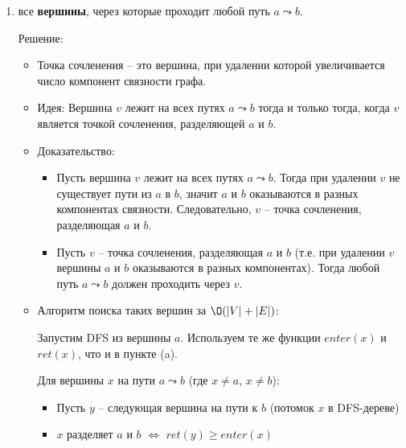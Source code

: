 \begin{enumerate}
\begin{enumerate}
\begin{itemize}
        Итого: $\O(|V| + |E|)$
        
        \item Сложность по памяти: $\O(|V|)$ -- массивы $enter$, $ret$, $parent$
      \end{itemize}

      \item все \textbf{вершины}, через которые проходит любой путь $a \leadsto b$.
      
      Решение:

      \begin{itemize}
        \item Точка сочленения -- это вершина, при удалении которой увеличивается число компонент связности графа.

        \item Идея: Вершина $v$ лежит на всех путях $a \leadsto b$ тогда и только тогда, когда $v$ является точкой сочленения, разделяющей $a$ и $b$.

        \item Доказательство:
        \begin{itemize}
          \item[$\Rightarrow$] Пусть вершина $v$ лежит на всех путях $a \leadsto b$. Тогда при удалении $v$ не существует пути из $a$ в $b$, значит $a$ и $b$ оказываются в разных компонентах связности. Следовательно, $v$ -- точка сочленения, разделяющая $a$ и $b$.
          
          \item[$\Leftarrow$] Пусть $v$ -- точка сочленения, разделяющая $a$ и $b$ (т.е. при удалении $v$ вершины $a$ и $b$ оказываются в разных компонентах). Тогда любой путь $a \leadsto b$ должен проходить через $v$.
        \end{itemize}

        \item Алгоритм поиска таких вершин за $\O(|V| + |E|)$:

        Запустим DFS из вершины $a$. Используем те же функции $enter(x)$ и $ret(x)$, что и в пункте (a).
        
        Для вершины $x$ на пути $a \leadsto b$ (где $x \neq a$, $x \neq b$):
        \begin{itemize}
          \item Пусть $y$ -- следующая вершина на пути к $b$ (потомок $x$ в DFS-дереве)
          \item $x$ разделяет $a$ и $b$ $\Leftrightarrow$ $ret(y) \geq enter(x)$
        \end{itemize}
        

\end{itemize}
\end{enumerate}
\end{enumerate}
